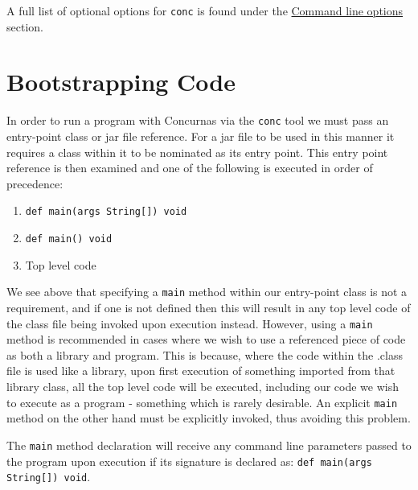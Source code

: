\documentclass[conc-doc]{subfiles}
\begin{document}
A full list of optional options for \lstinline{conc} is found under the \hyperref[sec:cmdlineparams]{Command line options} section.

\section{Bootstrapping Code}
In order to run a program with Concurnas via the \lstinline{conc} tool we must pass an entry-point class or jar file reference. For a jar file to be used in this manner it requires a class within it to be nominated as its entry point. This entry point reference is then examined and one of the following is executed in order of precedence:

\begin{enumerate}
	\item \lstinline!def main(args String[]) void!
	\item \lstinline!def main() void!
	\item Top level code
\end{enumerate}

We see above that specifying a \lstinline{main} method within our entry-point class is not a requirement, and if one is not defined then this will result in any top level code of the class file being invoked upon execution instead. However, using a \lstinline{main} method is recommended in cases where we wish to use a referenced piece of code as both a library and program. This is because, where the code within the .class file is used like a library, upon first execution of something imported from that library class, all the top level code will be executed, including our code we wish to execute as a program - something which is rarely desirable. An explicit \lstinline{main} method on the other hand must be explicitly invoked, thus avoiding this problem.

The \lstinline{main} method declaration will receive any command line parameters passed to the program upon execution if its signature is declared as: \lstinline{def main(args String[]) void}.
\end{document}
